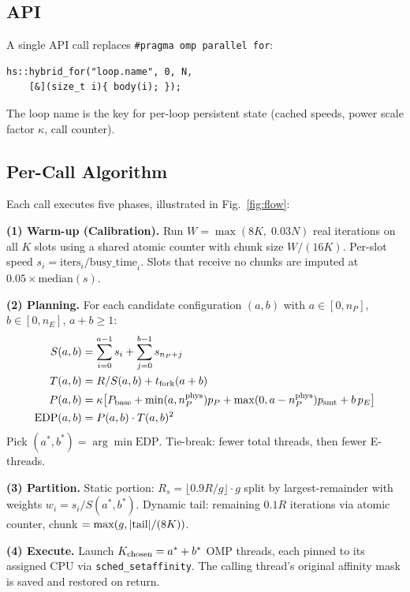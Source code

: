 \documentclass[conference]{IEEEtran}
\begin{document}
\subsection{API}

A single API call replaces \texttt{\#pragma omp parallel for}:
\begin{verbatim}
hs::hybrid_for("loop.name", 0, N,
    [&](size_t i){ body(i); });
\end{verbatim}
The loop name is the key for per-loop persistent state (cached speeds,
power scale factor $\kappa$, call counter).

\subsection{Per-Call Algorithm}

Each call executes five phases, illustrated in Fig.~\ref{fig:flow}:

\textbf{(1) Warm-up (Calibration).}
Run $W = \max(8K,\; 0.03N)$ real iterations on all $K$ slots
using a shared atomic counter with chunk size $W/(16K)$.
Per-slot speed $s_i = \text{iters}_i / \text{busy\_time}_i$.
Slots that receive no chunks are imputed at $0.05 \times \text{median}(s)$.

\textbf{(2) Planning.}
For each candidate configuration $(a, b)$ with $a \in [0, n_P]$,
$b \in [0, n_E]$, $a+b \geq 1$:
\begin{align}
S(a,b) &= \sum_{i=0}^{a-1} s_i + \sum_{j=0}^{b-1} s_{n_P+j} \notag \\
T(a,b) &= R / S(a,b) + t_{\text{fork}}(a+b) \notag \\
P(a,b) &= \kappa \bigl[ P_{\text{base}} + \min(a, n_P^{\text{phys}}) p_P
           + \max(0,a-n_P^{\text{phys}}) p_{\text{smt}} + b\, p_E \bigr] \notag \\
\text{EDP}(a,b) &= P(a,b) \cdot T(a,b)^2 \notag
\end{align}
Pick $(a^*, b^*) = \arg\min \text{EDP}$.
Tie-break: fewer total threads, then fewer E-threads.

\textbf{(3) Partition.}
Static portion: $R_s = \lfloor 0.9R / g \rfloor \cdot g$
split by largest-remainder with weights $w_i = s_i / S(a^*,b^*)$.
Dynamic tail: remaining $0.1R$ iterations via atomic counter,
chunk $= \max(g, |{\rm tail}|/(8K))$.

\textbf{(4) Execute.}
Launch $K_{\rm chosen} = a^*+b^*$ OMP threads, each pinned
to its assigned CPU via \texttt{sched\_setaffinity}.
The calling thread's original affinity mask is saved and restored on return.
\end{document}
